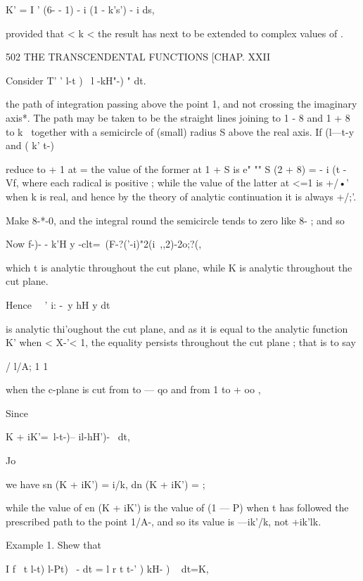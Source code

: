K' = I ' (6- - 1) - i (1 - k's') - i ds,

provided that < k <\; the result has next to be extended to complex
values of .



502 THE TRANSCENDENTAL FUNCTIONS [CHAP. XXII



Consider T' ' l-t )~ l -kH"-) " dt.



the path of integration passing above the point 1, and not crossing
the imaginary axis*. The path may be taken to be the straight lines
joining to 1 - 8 and 1 + 8 to k~ together with a semicircle of (small)
radius S above the real axis. If (l—t-y and ( k' t-)

reduce to + 1 at = the value of the former at 1 + S is e" "" S (2 + 8)
= - i (t - Vf, where each radical is positive ; while the value of the
latter at <=1 is +/•' when k is real, and hence by the theory of
analytic continuation it is always +/;'.

Make 8-*-0, and the integral round the semicircle tends to zero like
8- ; and so

Now f-)- - k'H y -clt=\ (F-?('-i)"2(i\ ,,2)-2o;?(,

which t is analytic throughout the cut plane, while K is analytic
throughout the cut plane.

Hence \ \ ' i: -\ y hH y dt

is analytic thi'oughout the cut plane, and as it is equal to the
analytic function K' when < X-'< 1, the equality persists throughout
the cut plane ; that is to say



/ l/A; 1 1



when the c-plane is cut from to — qo and from 1 to + oo ,



Since



K + iK'=\ l-t-)-- il-hH')- ~dt,

Jo



we have sn (K + iK') = i/k, dn (K + iK') = ;

while the value of en (K + iK') is the value of (1 — P) when t has
followed the prescribed path to the point 1/A-, and so its value is
—ik'/k, not +ik'lk.

Example 1. Shew that

I f \ t l-t) l-Pt) ~- dt = l r t t-' ) kH- ) ~ dt=K,

